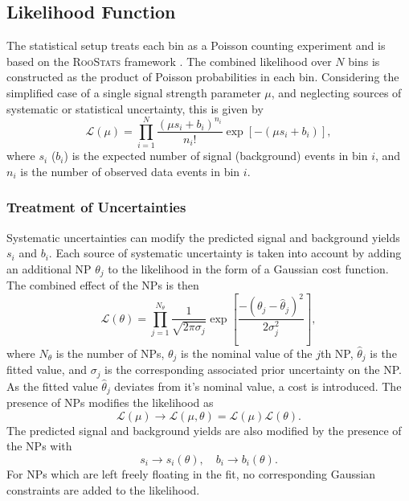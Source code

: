 \subsection{Likelihood Function}

The statistical setup treats each bin as a Poisson counting experiment and is based on the \textsc{RooStats} framework \cite{moneta2010roostats}.
The combined likelihood over $N$ bins is constructed as the product of Poisson probabilities in each bin.
Considering the simplified case of a single signal strength parameter $\mu$, and neglecting sources of systematic or statistical uncertainty, this is given by
%
\begin{equation}
    \mathcal{L}(\mu) = \prod_{i=1}^N \frac{(\mu s_i + b_i)^{n_i}}{n_i!} \exp \left[ - (\mu s_i + b_i) \right],
\end{equation}
%
where $s_i$ ($b_i$) is the expected number of signal (background) events in bin $i$, and $n_i$ is the number of observed data events in bin $i$.

\subsubsection{Treatment of Uncertainties}

Systematic uncertainties can modify the predicted signal and background yields $s_i$ and $b_i$. 
Each source of systematic uncertainty is taken into account by adding an additional NP $\theta_j$ to the likelihood in the form of a Gaussian cost function.
The combined effect of the NPs is then
%
\begin{equation}
  \mathcal{L}(\theta) = 
  \prod_{j = 1}^{N_\theta}
  \frac{1}{\sqrt{2 \pi \sigma_j}}
  \exp\left[ \frac{- (\theta_j - \hat{\theta}_j)^2}{2 \sigma_j^2} \right] ,
\end{equation}
%
where $N_\theta$ is the number of NPs, $\theta_j$ is the nominal value of the $j$th NP, $\hat{\theta}_j$ is the fitted value, and $\sigma_j$ is the corresponding associated prior uncertainty on the NP.
As the fitted value $\hat{\theta}_j$ deviates from it's nominal value, a cost is introduced.
The presence of NPs modifies the likelihood as 
%
\begin{equation}
    \mathcal{L}(\mu) \rightarrow \mathcal{L}(\mu, \theta) = \mathcal{L}(\mu) \mathcal{L}(\theta) .
\end{equation}
%
The predicted signal and background yields are also modified by the presence of the NPs with
%
\begin{equation}
  s_i \rightarrow s_i(\theta) , \quad b_i \rightarrow b_i(\theta) .
\end{equation}
%
For NPs which are left freely floating in the fit, no corresponding Gaussian constraints are added to the likelihood.

